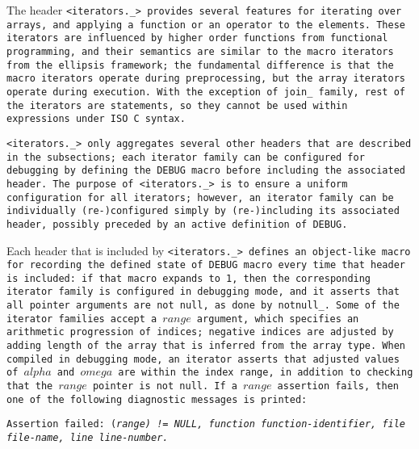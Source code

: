 \def\Subsection#1{\subsection{#1}}

The header \tt{<iterators._>} provides several features for iterating
over arrays, and applying a function or an operator to the elements.
These iterators are influenced by higher order functions from functional
programming, and their semantics are similar to the macro iterators from the
ellipsis framework; the fundamental difference is that the macro iterators
operate during preprocessing, but the array iterators operate during execution.
With the exception of \tt{join_} family, rest of the iterators are
statements, so they cannot be used within expressions under ISO C syntax.

\tt{<iterators._>} only aggregates several other headers that are described
in the subsections; each iterator family can be configured for debugging
by defining the \tt{DEBUG} macro before including the associated header.
The purpose of \tt{<iterators._>} is to ensure a uniform
configuration for all iterators; however, an iterator family can
be individually (re-)configured simply by (re-)including its associated
header, possibly preceded by an active definition of \tt{DEBUG}.

Each header that is included by \tt{<iterators._>} defines an object-like
macro for recording the \tt{defined} state of \tt{DEBUG} macro every time
that header is included: if that macro expands to \tt{1}, then the
corresponding iterator family is configured in debugging mode, and it
asserts that all pointer arguments are not null, as done by \tt{notnull_}.
Some of the iterator families accept a $range$ argument, which specifies
an arithmetic progression of indices; negative indices are adjusted
by adding length of the array that is inferred from the array type.
When compiled in debugging mode, an iterator asserts that
adjusted values of $alpha$ and $omega$ are within the index range,
in addition to checking that the $range$ pointer is not null.
If a $range$ assertion fails, then one of the
following diagnostic messages is printed:

\begin{center}
\tt{Assertion failed:} \tt{(}\it{range}\tt{) != NULL}\tt{, function}
\it{function-identifier}\tt{, file}
\it{file-name}\tt{, line}
\it{line-number}\tt{.}\\
\end{center}

